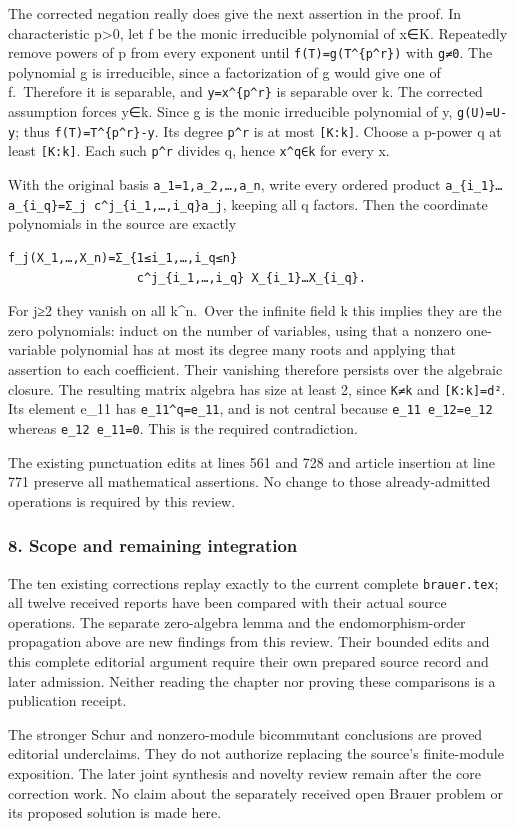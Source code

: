 \documentclass[11pt]{article}
\begin{document}
The corrected negation really does give the next assertion in the proof. In characteristic p\textgreater0, let f be the monic irreducible polynomial of x∈K. Repeatedly remove powers of p from every exponent until \texttt{f(T)=g(T\^{}\{p\^{}r\})} with \texttt{g\textquotesingle{}≠0}. The polynomial g is irreducible, since a factorization of g would give one of f.~Therefore it is separable, and \texttt{y=x\^{}\{p\^{}r\}} is separable over k. The corrected assumption forces y∈k. Since g is the monic irreducible polynomial of y, \texttt{g(U)=U-y}; thus \texttt{f(T)=T\^{}\{p\^{}r\}-y}. Its degree \texttt{p\^{}r} is at most \texttt{{[}K:k{]}}. Choose a p-power q at least \texttt{{[}K:k{]}}. Each such \texttt{p\^{}r} divides q, hence \texttt{x\^{}q∈k} for every x.

With the original basis \texttt{a\_1=1,a\_2,…,a\_n}, write every ordered product \texttt{a\_\{i\_1\}…a\_\{i\_q\}=Σ\_j\ c\^{}j\_\{i\_1,…,i\_q\}a\_j}, keeping all q factors. Then the coordinate polynomials in the source are exactly

\begin{verbatim}
f_j(X_1,…,X_n)=Σ_{1≤i_1,…,i_q≤n}
                  c^j_{i_1,…,i_q} X_{i_1}…X_{i_q}.
\end{verbatim}

For j≥2 they vanish on all k\^{}n.~Over the infinite field k this implies they are the zero polynomials: induct on the number of variables, using that a nonzero one-variable polynomial has at most its degree many roots and applying that assertion to each coefficient. Their vanishing therefore persists over the algebraic closure. The resulting matrix algebra has size at least 2, since \texttt{K≠k} and \texttt{{[}K:k{]}=d²}. Its element e\_11 has \texttt{e\_11\^{}q=e\_11}, and is not central because \texttt{e\_11\ e\_12=e\_12} whereas \texttt{e\_12\ e\_11=0}. This is the required contradiction.

The existing punctuation edits at lines 561 and 728 and article insertion at line 771 preserve all mathematical assertions. No change to those already-admitted operations is required by this review.

\subsubsection{8. Scope and remaining integration}\label{scope-and-remaining-integration}

The ten existing corrections replay exactly to the current complete \texttt{brauer.tex}; all twelve received reports have been compared with their actual source operations. The separate zero-algebra lemma and the endomorphism-order propagation above are new findings from this review. Their bounded edits and this complete editorial argument require their own prepared source record and later admission. Neither reading the chapter nor proving these comparisons is a publication receipt.

The stronger Schur and nonzero-module bicommutant conclusions are proved editorial underclaims. They do not authorize replacing the source's finite-module exposition. The later joint synthesis and novelty review remain after the core correction work. No claim about the separately received open Brauer problem or its proposed solution is made here.
\end{document}
